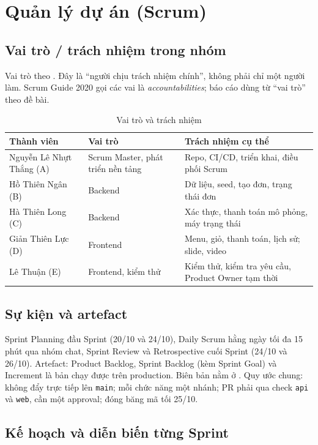 \chapter{Quản lý dự án (Scrum)}\label{ch:quanly}
\section{Vai trò / trách nhiệm trong nhóm}\label{sec:se-vaitro}
Vai trò theo . Đây là ``người chịu trách nhiệm chính'', không phải chỉ một người làm. Scrum Guide 2020 gọi các vai là \emph{accountabilities}; báo cáo dùng từ ``vai trò'' theo đề bài.
\begin{table}[htbp]\centering
\caption{Vai trò và trách nhiệm}\label{tab:vaitro}
\begin{tabular}{@{}p{3.4cm}p{3.8cm}p{5.8cm}@{}}\toprule
\textbf{Thành viên} & \textbf{Vai trò} & \textbf{Trách nhiệm cụ thể} \\ \midrule
Nguyễn Lê Nhựt Thắng (A) & Scrum Master, phát triển nền tảng & Repo, CI/CD, triển khai, điều phối Scrum \\
Hồ Thiên Ngân (B) & Backend & Dữ liệu, seed, tạo đơn, trạng thái đơn \\
Hà Thiên Long (C) & Backend & Xác thực, thanh toán mô phỏng, máy trạng thái \\
Giản Thiên Lực (D) & Frontend & Menu, giỏ, thanh toán, lịch sử; slide, video \\
Lê Thuận (E) & Frontend, kiểm thử & Kiểm thử, kiểm tra yêu cầu, Product Owner tạm thời \\ \bottomrule
\end{tabular}
\end{table}

\section{Sự kiện và artefact}\label{sec:se-suKien}
Sprint Planning đầu Sprint (20/10 và 24/10), Daily Scrum hằng ngày tối đa 15 phút qua nhóm chat, Sprint Review và Retrospective cuối Sprint (24/10 và 26/10). Artefact: Product Backlog, Sprint Backlog (kèm Sprint Goal) và Increment là bản chạy được trên production. Biên bản nằm ở . Quy ước chung: không đẩy trực tiếp lên \texttt{main}; mỗi chức năng một nhánh; PR phải qua check \texttt{api} và \texttt{web}, cần một approval; đóng băng mã tối 25/10.

\section{Kế hoạch và diễn biến từng Sprint}\label{sec:se-sprint}
